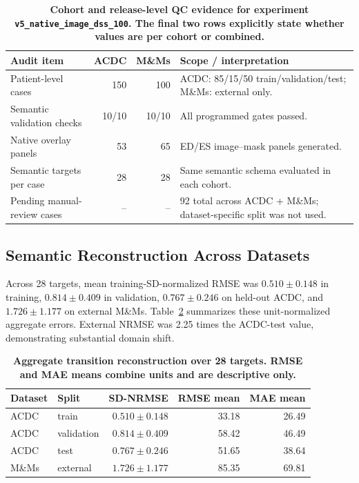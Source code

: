 \documentclass{ceurart}
\begin{document}
\begin{table}[!htbp]
\caption{\textbf{Cohort and release-level QC evidence for experiment \texttt{v5\_native\_image\_dss\_100}. The final two rows explicitly state whether values are per cohort or combined.}}
\label{tab:cohort_qc_evidence}
\centering
\small
\begin{tabularx}{\linewidth}{lrrX}
\toprule
Audit item & ACDC & M\&Ms & Scope / interpretation \\
\midrule
Patient-level cases & 150 & 100 & ACDC: 85/15/50 train/validation/test; M\&Ms: external only. \\
Semantic validation checks & 10/10 & 10/10 & All programmed gates passed. \\
Native overlay panels & 53 & 65 & ED/ES image--mask panels generated. \\
Semantic targets per case & 28 & 28 & Same semantic schema evaluated in each cohort. \\
Pending manual-review cases & -- & -- & 92 total across ACDC + M\&Ms; dataset-specific split was not used. \\
\bottomrule
\end{tabularx}
\end{table}

\subsection{Semantic Reconstruction Across Datasets}\label{subsec:semantic_reconstruction_results}

Across 28 targets, mean training-SD-normalized RMSE was \(0.510\pm0.148\) in training, \(0.814\pm0.409\) in validation, \(0.767\pm0.246\) on held-out ACDC, and \(1.726\pm1.177\) on external M\&Ms. Table~\ref{tab:transition_aggregate_errors} summarizes these unit-normalized aggregate errors. External NRMSE was 2.25 times the ACDC-test value, demonstrating substantial domain shift.

\begin{table}[!htbp]
\caption{\textbf{Aggregate transition reconstruction over 28 targets. RMSE and MAE means combine units and are descriptive only.}}
\label{tab:transition_aggregate_errors}
\centering
\small
\begin{tabular}{llrrr}
\toprule
Dataset & Split & SD-NRMSE & RMSE mean & MAE mean \\
\midrule
ACDC & train & \(0.510\pm0.148\) & 33.18 & 26.49 \\
ACDC & validation & \(0.814\pm0.409\) & 58.42 & 46.49 \\
ACDC & test & \(0.767\pm0.246\) & 51.65 & 38.64 \\
M\&Ms & external & \(1.726\pm1.177\) & 85.35 & 69.81 \\
\bottomrule
\end{tabular}
\end{table}
\end{document}

